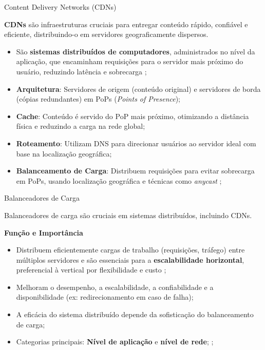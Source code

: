 \documentclass[10pt]{beamer}
\begin{document}
\begin{frame}{Content Delivery Networks (CDNs)}

\textbf{CDNs} são infraestruturas cruciais para entregar conteúdo rápido, confiável e eficiente, distribuindo-o em servidores geograficamente dispersos.

\begin{itemize}
    \item São \textbf{sistemas distribuídos de computadores}, administrados no nível da aplicação, que encaminham requisições para o servidor mais próximo do usuário, reduzindo latência e sobrecarga \cite{Preston2021Finding};
    \item \textbf{Arquitetura}: Servidores de origem (conteúdo original) e servidores de borda (cópias redundantes) em PoPs (\textit{Points of Presence});
    \item \textbf{Cache}: Conteúdo é servido do PoP mais próximo, otimizando a distância física e reduzindo a carga na rede global;
    \item \textbf{Roteamento}: Utilizam DNS para direcionar usuários ao servidor ideal com base na localização geográfica;
    \item \textbf{Balanceamento de Carga}: Distribuem requisições para evitar sobrecarga em PoPs, usando localização geográfica e técnicas como \textit{anycast} \cite{Preston2021Finding};
\end{itemize}
\end{frame}


\begin{frame}{Balanceadores de Carga}

Balanceadores de carga são cruciais em sistemas distribuídos, incluindo CDNs.

\textbf{Função e Importância}
\begin{itemize}
    \item Distribuem eficientemente cargas de trabalho (requisições, tráfego) entre múltiplos servidores e são essenciais para a \textbf{escalabilidade horizontal}, preferencial à vertical por flexibilidade e custo \cite{scalabilityIssuesInDatabaseSystems};
    \item Melhoram o desempenho, a escalabilidade, a confiabilidade e a disponibilidade (ex: redirecionamento em caso de falha);
    \item A eficácia do sistema distribuído depende da sofisticação do balanceamento de carga;
    \item Categorias principais: \textbf{Nível de aplicação} e \textbf{nível de rede}; \cite{Pandian2022ICCBI};
\end{itemize}
\end{frame}
\end{document}
